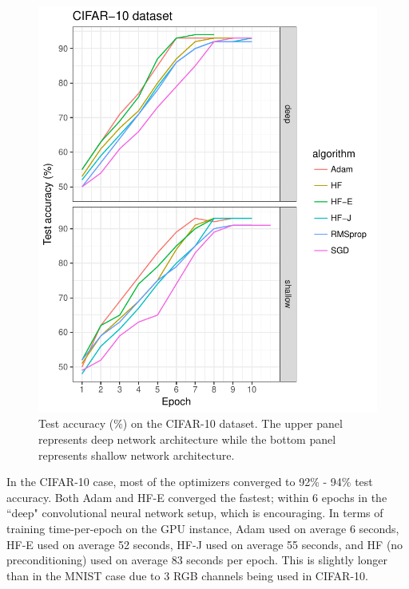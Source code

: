 \documentclass[10pt,twocolumn,letterpaper]{article}
\begin{document}
\begin{figure}
\begin{center}
\includegraphics[scale=0.7]{plot_2.pdf}
\caption{Test accuracy (\%) on the CIFAR-10 dataset. The upper panel represents deep network architecture while the bottom panel represents shallow network architecture.}
\label{fig:data_cifar_1}
\end{center}
\end{figure}  

In the CIFAR-10 case, most of the optimizers converged to 92\% - 94\% test accuracy. Both Adam and HF-E converged the fastest; within 6 epochs in the ``deep" convolutional neural network setup, which is encouraging. In terms of training time-per-epoch on the GPU instance, Adam used on average 6 seconds, HF-E used on average 52 seconds, HF-J used on average 55 seconds, and HF (no preconditioning) used on average 83 seconds per epoch. This is slightly longer than in the MNIST case due to 3 RGB channels being used in CIFAR-10.
\end{document}
